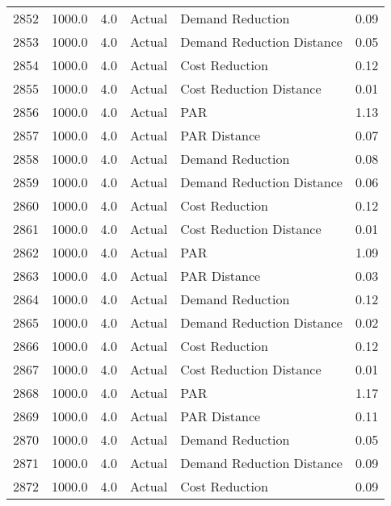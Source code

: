 \begin{longtable}{lrrllr}
2852 &       1000.0 &     4.0 &         Actual &           Demand Reduction &   0.09 \\
2853 &       1000.0 &     4.0 &         Actual &  Demand Reduction Distance &   0.05 \\
2854 &       1000.0 &     4.0 &         Actual &             Cost Reduction &   0.12 \\
2855 &       1000.0 &     4.0 &         Actual &    Cost Reduction Distance &   0.01 \\
2856 &       1000.0 &     4.0 &         Actual &                        PAR &   1.13 \\
2857 &       1000.0 &     4.0 &         Actual &               PAR Distance &   0.07 \\
2858 &       1000.0 &     4.0 &         Actual &           Demand Reduction &   0.08 \\
2859 &       1000.0 &     4.0 &         Actual &  Demand Reduction Distance &   0.06 \\
2860 &       1000.0 &     4.0 &         Actual &             Cost Reduction &   0.12 \\
2861 &       1000.0 &     4.0 &         Actual &    Cost Reduction Distance &   0.01 \\
2862 &       1000.0 &     4.0 &         Actual &                        PAR &   1.09 \\
2863 &       1000.0 &     4.0 &         Actual &               PAR Distance &   0.03 \\
2864 &       1000.0 &     4.0 &         Actual &           Demand Reduction &   0.12 \\
2865 &       1000.0 &     4.0 &         Actual &  Demand Reduction Distance &   0.02 \\
2866 &       1000.0 &     4.0 &         Actual &             Cost Reduction &   0.12 \\
2867 &       1000.0 &     4.0 &         Actual &    Cost Reduction Distance &   0.01 \\
2868 &       1000.0 &     4.0 &         Actual &                        PAR &   1.17 \\
2869 &       1000.0 &     4.0 &         Actual &               PAR Distance &   0.11 \\
2870 &       1000.0 &     4.0 &         Actual &           Demand Reduction &   0.05 \\
2871 &       1000.0 &     4.0 &         Actual &  Demand Reduction Distance &   0.09 \\
2872 &       1000.0 &     4.0 &         Actual &             Cost Reduction &   0.09 \\

\end{longtable}

